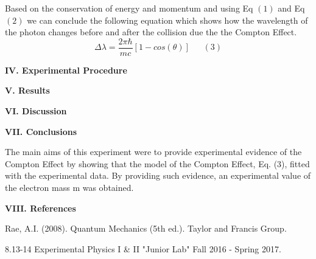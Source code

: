 \documentclass[fleqn]{article}
\begin{document}
  \vspace{15px}

  Based on the conservation of energy and momentum and using Eq $(1)$ and Eq $(2)$ we can conclude the following equation which shows
  how the wavelength of the photon changes before and after the collision due the the Compton Effect.
  $$\Delta \lambda=\dfrac{2 \pi \hbar}{mc} \left[1-cos(\theta)\right] ~~~~~~~ (3)$$

  \vspace{10px}

  \textbf{IV. Experimental Procedure}

  \textbf{V. Results}

  \textbf{VI. Discussion}

  \textbf{VII. Conclusions}

  \vspace{10px}

  The main aims of this experiment were to provide experimental evidence of the Compton Effect by showing that the model of the Compton Effect,
  Eq. (3), fitted with the experimental data. By providing such evidence, an experimental value of the electron mass m was obtained.

  \vspace{15px}

  \textbf{VIII. References}

  \vspace{15px}

  Rae, A.I. (2008). Quantum Mechanics (5th ed.). Taylor and Francis Group.

  \vspace{5px}

  8.13-14 Experimental Physics I \& II "Junior Lab" Fall 2016 - Spring 2017.
\end{document}
